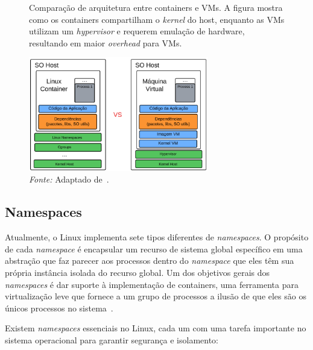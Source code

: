 \begin{figure}[htbp]
  \centering
  \caption{Comparação de arquitetura entre containers e VMs. A figura mostra como os containers compartilham o \textit{kernel} do host, enquanto as VMs utilizam um \textit{hypervisor} e requerem emulação de hardware, resultando em maior \textit{overhead} para VMs.}
  \includegraphics[width=0.7\textwidth]{images/vm_x_container_2.png}
  \caption*{\textit{Fonte:} Adaptado de~\citep{OCIContainer}.}
  \label{fig:vm_x_container}
\end{figure}


\subsection{Namespaces}

Atualmente, o Linux implementa sete tipos diferentes de \textit{namespaces}. O propósito de cada \textit{namespace} é encapsular um recurso de sistema global específico em uma abstração que faz parecer aos processos dentro do \textit{namespace} que eles têm sua própria instância isolada do recurso global. Um dos objetivos gerais dos \textit{namespaces} é dar suporte à implementação de containers, uma ferramenta para virtualização leve que fornece a um grupo de processos a ilusão de que eles são os únicos processos no sistema~\citep{LWNNamespaces}.

Existem \textit{namespaces} essenciais no Linux, cada um com uma tarefa importante no sistema operacional para garantir segurança e isolamento:

